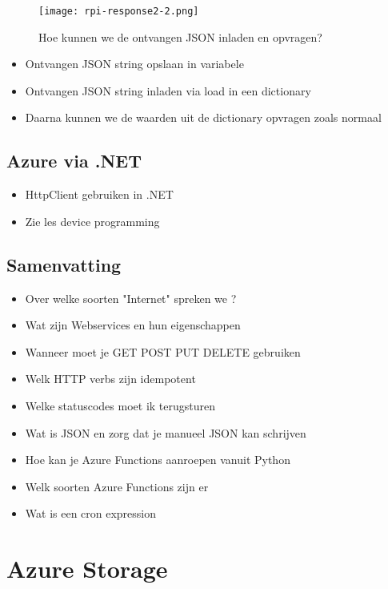 \documentclass{article}
\begin{document}
\begin{figure}[H]
    \centering
    \texttt{[image: rpi-response2-2.png]}
    \caption{Hoe kunnen we de ontvangen JSON inladen en opvragen?}
\end{figure}

\begin{itemize}
    \item Ontvangen JSON string opslaan in variabele
    \item Ontvangen JSON string inladen via load in een dictionary
    \item Daarna kunnen we de waarden uit de dictionary opvragen zoals normaal
\end{itemize}

\subsection{Azure via .NET}
\begin{itemize}
    \item HttpClient gebruiken in .NET
    \item Zie les device programming
\end{itemize}


\subsection{Samenvatting}
\begin{itemize}
    \item Over welke soorten "Internet" spreken we ?
    \item Wat zijn Webservices en hun eigenschappen
    \item Wanneer moet je GET POST PUT DELETE gebruiken
    \item Welk HTTP verbs zijn idempotent
    \item Welke statuscodes moet ik terugsturen
    \item Wat is JSON en zorg dat je manueel JSON kan schrijven
    \item Hoe kan je Azure Functions aanroepen vanuit Python
    \item Welk soorten Azure Functions zijn er
    \item Wat is een cron expression
\end{itemize}

\section{Azure Storage}
\end{document}
